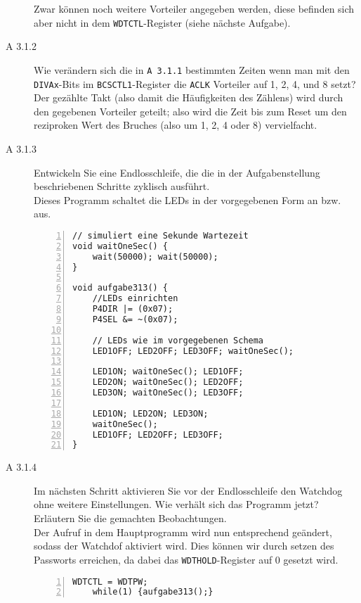 \documentclass[11pt,a4paper,ngerman]{article}
\begin{document}
\begin{description}
	 Zwar können noch weitere Vorteiler angegeben werden, diese befinden sich aber nicht in dem \texttt{WDTCTL}-Register (siehe nächste Aufgabe).
	
	\item[A 3.1.2] Wie verändern sich die in \texttt{A 3.1.1} bestimmten Zeiten wenn man mit den \texttt{DIVAx}-Bits im \texttt{BCSCTL1}-Register die \texttt{ACLK} Vorteiler auf 1, 2, 4, und 8 setzt?  \\
	
	Der gezählte Takt (also damit die Häufigkeiten des Zählens) wird durch den gegebenen Vorteiler geteilt; also wird die Zeit bis zum Reset um den reziproken Wert des Bruches (also um 1, 2, 4 oder 8) vervielfacht. 	
	
	\item[A 3.1.3] Entwickeln Sie eine Endlosschleife, die die in der Aufgabenstellung beschriebenen Schritte zyklisch ausführt.  \\
	
	Dieses Programm schaltet die LEDs in der vorgegebenen Form an bzw. aus.
\begin{lstlisting}[numbers=left]
// simuliert eine Sekunde Wartezeit
void waitOneSec() {
	wait(50000); wait(50000);
}

void aufgabe313() {
	//LEDs einrichten
	P4DIR |= (0x07);
	P4SEL &= ~(0x07);
	
	// LEDs wie im vorgegebenen Schema
	LED1OFF; LED2OFF; LED3OFF; waitOneSec();
	
	LED1ON; waitOneSec(); LED1OFF;
	LED2ON; waitOneSec(); LED2OFF;
	LED3ON; waitOneSec(); LED3OFF;

	LED1ON; LED2ON; LED3ON;
	waitOneSec();
	LED1OFF; LED2OFF; LED3OFF;
}
\end{lstlisting}
	
		 
	\item[A 3.1.4]  Im nächsten Schritt aktivieren Sie vor der Endlosschleife den Watchdog ohne weitere Einstellungen. Wie verhält sich das Programm jetzt? Erläutern Sie die gemachten Beobachtungen.   \\
	
	Der Aufruf in dem Hauptprogramm wird nun entsprechend geändert, sodass der Watchdof aktiviert wird. Dies können wir durch setzen des Passworts erreichen, da dabei das \texttt{WDTHOLD}-Register auf 0 gesetzt wird.
	
	\begin{lstlisting}[numbers=left]
	WDTCTL = WDTPW;
	while(1) {aufgabe313();}
	\end{lstlisting}
	

\end{description}
\end{document}
